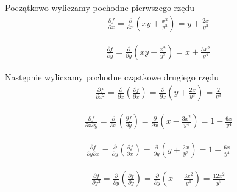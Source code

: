 \documentclass[12pt]{article}
\begin{document}
\begin{itemize}
        Początkowo wyliczamy pochodne pierwszego rzędu
        \begin{equation}
            \begin{aligned}
                \frac{\partial f}{\partial x} = \frac{\partial }{\partial x} \left( xy + \frac{x^2}{y^3}\right ) = y + \frac{2x}{y^3}
            \end{aligned}
        \end{equation}

        \begin{equation}
            \begin{aligned}
                \frac{\partial f}{\partial y} = \frac{\partial }{\partial y} \left( xy + \frac{x^2}{y^3}\right ) = x + \frac{3x^2}{y^4}
            \end{aligned}
        \end{equation}

        Następnie wyliczamy pochodne cząstkowe drugiego rzędu
        \begin{equation}
            \begin{aligned}
                \frac{\partial f }{\partial x^2} = \frac{\partial}{\partial x} \left( \frac{\partial f}{\partial x} \right ) = \frac{\partial}{ \partial x} \left( y + \frac{2x}{y^3} \right) = \frac{2}{y^3}
            \end{aligned}
        \end{equation}

        \begin{equation}
            \begin{aligned}
                \frac{\partial f }{\partial x \partial y} = \frac{\partial}{\partial x} \left( \frac{\partial f}{\partial y} \right) = \frac{\partial}{\partial x} \left( x - \frac{3x^2}{y^4} \right) = 1 - \frac{6x}{y^4}
            \end{aligned}
        \end{equation}

        \begin{equation}
            \begin{aligned}
                \frac{\partial f }{\partial y \partial x} = \frac{\partial}{\partial y} \left( \frac{\partial f}{\partial x} \right) = \frac{\partial}{\partial y} \left( y + \frac{2x}{y^3} \right) = 1 - \frac{6x}{y^4}
            \end{aligned}
        \end{equation}

        \begin{equation}
            \begin{aligned}
                \frac{\partial f }{\partial y^2} = \frac{\partial}{\partial y} \left( \frac{\partial f}{\partial y} \right) = \frac{\partial}{\partial y} \left( x - \frac{3x^2}{y^4} \right) = \frac{12x^2}{y^5}
            \end{aligned}
        \end{equation}


\end{itemize}
\end{document}
